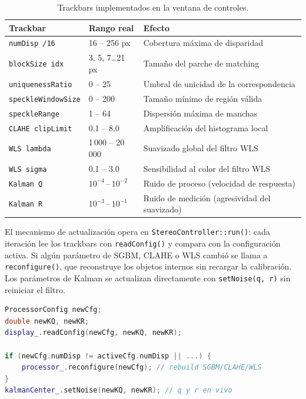 \documentclass[12pt, a4paper]{article}
\begin{document}
\begin{table}[htbp]
\centering
\caption{Trackbars implementados en la ventana de controles.}
\label{tab:trackbars}
\small
\begin{tabular}{p{3.6cm} p{2.6cm} p{6.6cm}}
\toprule
\textbf{Trackbar} & \textbf{Rango real} & \textbf{Efecto} \\
\midrule
\texttt{numDisp /16}        & 16 – 256 px           & Cobertura máxima de disparidad \\
\texttt{blockSize idx}      & 3, 5, 7\ldots{}21 px  & Tamaño del parche de matching \\
\texttt{uniquenessRatio}    & 0 – 25                & Umbral de unicidad de la correspondencia \\
\texttt{speckleWindowSize}  & 0 – 200               & Tamaño mínimo de región válida \\
\texttt{speckleRange}       & 1 – 64                & Dispersión máxima de manchas \\
\texttt{CLAHE clipLimit}    & 0.1 – 8.0             & Amplificación del histograma local \\
\texttt{WLS lambda}         & 1\,000 – 20\,000      & Suavizado global del filtro WLS \\
\texttt{WLS sigma}          & 0.1 – 3.0             & Sensibilidad al color del filtro WLS \\
\texttt{Kalman Q}           & $10^{-4}$\,--\,$10^{-2}$ & Ruido de proceso (velocidad de respuesta) \\
\texttt{Kalman R}           & $10^{-3}$\,--\,$10^{-1}$ & Ruido de medición (agresividad del suavizado) \\
\bottomrule
\end{tabular}
\end{table}

El mecanismo de actualización opera en \texttt{StereoController::run()}: cada
iteración lee los trackbars con \texttt{readConfig()} y compara con la
configuración activa. Si algún parámetro de SGBM, CLAHE o WLS cambió se
llama a \texttt{reconfigure()}, que reconstruye los objetos internos sin
recargar la calibración. Los parámetros de Kalman se actualizan directamente
con \texttt{setNoise(q,~r)} sin reiniciar el filtro.

\begin{lstlisting}[language=C++, caption={Reconfiguración dinámica desde trackbars.}]
ProcessorConfig newCfg;
double newKQ, newKR;
display_.readConfig(newCfg, newKQ, newKR);

if (newCfg.numDisp != activeCfg.numDisp || ...) {
    processor_.reconfigure(newCfg); // rebuild SGBM/CLAHE/WLS
}
kalmanCenter_.setNoise(newKQ, newKR); // q y r en vivo
\end{lstlisting}
\end{document}
